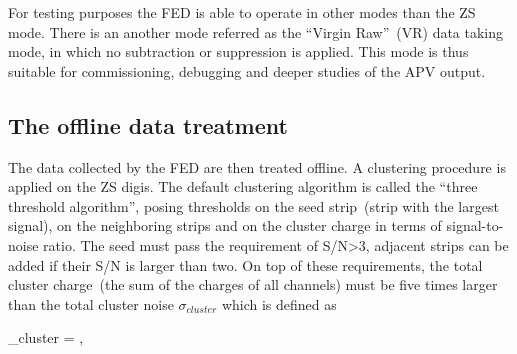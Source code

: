 For testing purposes the FED is able to operate in other modes than the ZS mode. There is an another mode referred as the ``Virgin Raw''~(VR) data taking mode, in which no subtraction or suppression is applied. This mode is thus suitable for commissioning, debugging and deeper studies of the APV output.





\subsection{The offline data treatment~\label{sec:localreco}}


The data collected by the FED are then treated offline. A clustering procedure is applied on the ZS digis. The default clustering algorithm is called the ``three threshold algorithm'', posing thresholds on the seed strip~(strip with the largest signal), on the neighboring strips and on the cluster charge in terms of signal-to-noise ratio. The seed must pass the requirement of S/N>3, adjacent strips can be added if their S/N is larger than two. On top of these requirements, the total cluster charge~(the sum of the charges of all channels) must be five times larger than the total cluster noise $\sigma_{cluster}$ which is defined as


{
    \sigma_{cluster} = ,
}


